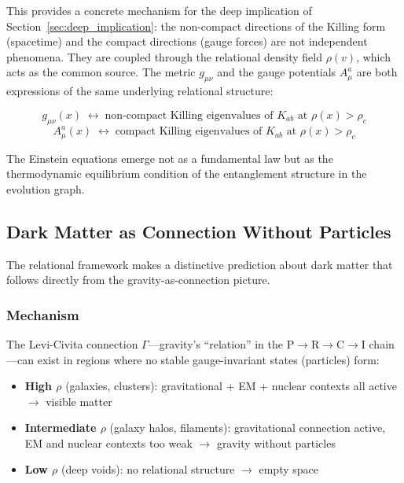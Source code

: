 This provides a concrete mechanism for the deep implication of Section~\ref{sec:deep_implication}: the non-compact directions of the Killing form (spacetime) and the compact directions (gauge forces) are not independent phenomena. They are coupled through the relational density field $\rho(v)$, which acts as the common source. The metric $g_{\mu\nu}$ and the gauge potentials $A_\mu^a$ are both expressions of the same underlying relational structure:

\begin{equation}
g_{\mu\nu}(x) \;\leftrightarrow\; \text{non-compact Killing eigenvalues of } K_{ab} \text{ at } \rho(x) > \rho_c
\end{equation}
\begin{equation}
A_\mu^a(x) \;\leftrightarrow\; \text{compact Killing eigenvalues of } K_{ab} \text{ at } \rho(x) > \rho_c
\end{equation}

The Einstein equations emerge not as a fundamental law but as the thermodynamic equilibrium condition of the entanglement structure in the evolution graph.

\subsection{Dark Matter as Connection Without Particles}\label{sec:dark_matter}

The relational framework makes a distinctive prediction about dark matter that follows directly from the gravity-as-connection picture.

\subsubsection{Mechanism}

The Levi-Civita connection $\Gamma$---gravity's ``relation'' in the P$\to$R$\to$C$\to$I chain---can exist in regions where no stable gauge-invariant states (particles) form:

\begin{itemize}
\item \textbf{High $\rho$} (galaxies, clusters): gravitational $+$ EM $+$ nuclear contexts all active $\to$ visible matter
\item \textbf{Intermediate $\rho$} (galaxy halos, filaments): gravitational connection active, EM and nuclear contexts too weak $\to$ gravity without particles
\item \textbf{Low $\rho$} (deep voids): no relational structure $\to$ empty space
\end{itemize}

